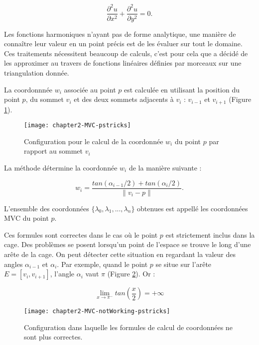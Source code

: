 \begin{equation}
  \frac{\partial^2 u}{\partial x^2} + \frac{\partial^2 u}{\partial y^2} = 0.
\end{equation}

Les fonctions harmoniques n'ayant pas de forme analytique, une manière de
connaître leur valeur en un point précis est de les évaluer sur tout le
domaine. Ces traitements nécessitent beaucoup de calculs, c'est pour cela que
\cite{Flo03} a décidé de les approximer au travers de fonctions linéaires
définies par morceaux sur une triangulation donnée.

La coordonnnée $w_i$ associée au point $p$ est calculée en utilisant la
position du point $p$, du sommet $v_i$ et des deux sommets adjacents à $v_i$ :
$v_{i-1}$ et $v_{i+1}$ (Figure \ref{DEFcal}).

\begin{figure}[!ht]
    \texttt{[image: chapter2-MVC-pstricks]}

    \caption[Configuration pour calcul MVC] {Configuration pour le calcul de
la coordonnée $w_i$ du point $p$ par rapport au sommet $v_i$}

    \label{DEFcal}   
\end{figure}

La méthode détermine la coordonnée $w_i$ de la manière suivante :

\begin{equation}
  w_i = \frac{tan(\alpha_{i-1}/2) + tan(\alpha_i/2)}{\| v_i - p \|}.
  \label{DEFcoo}
\end{equation}

L'ensemble des coordonnées $\{\lambda_0, \lambda_1, ..., \lambda_n\}$ obtenues
est appellé les coordonnées MVC du point $p$.

Ces formules sont correctes dans le cas où le point $p$ est strictement inclus
dans la cage. Des problèmes se posent lorsqu'un point de l'espace se trouve le
long d'une arête de la cage. On peut détecter cette situation en regardant la
valeur des angles $\alpha_{i-1}$ et $\alpha_i$. Par exemple, quand le point
$p$ se situe sur l'arête $E = [v_i,v_{i+1}]$, l'angle $\alpha_i$ vaut $\pi$
(Figure \ref{DEFinc}). Or :

\begin{displaymath}
  \lim\limits_{x \to \pi^-} tan(\frac{x}{2}) = +\infty
\end{displaymath}

\begin{figure}[!ht]
    \texttt{[image: chapter2-MVC-notWorking-pstricks]}

    \caption[Cas particulier MVC] {Configuration dans laquelle les
formules de calcul de coordonnées ne sont plus correctes.}

    \label{DEFinc}
\end{figure}

